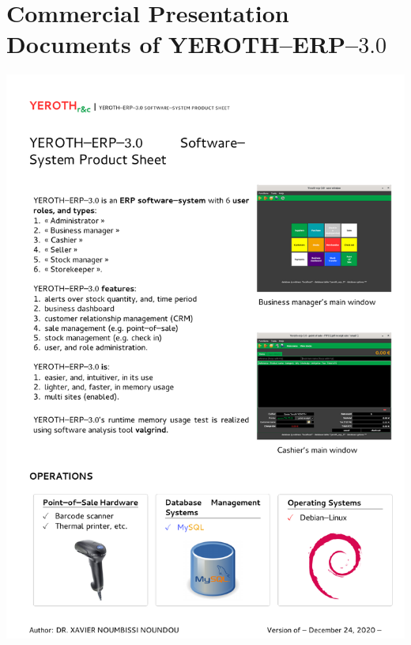 \chapter{Commercial Presentation Documents of YEROTH--ERP--$3.0$}

\newpage

\includegraphics[scale=0.93]{../yeroth-product-sheet/yeroth-erp-3-0-product-sheet.pdf}

